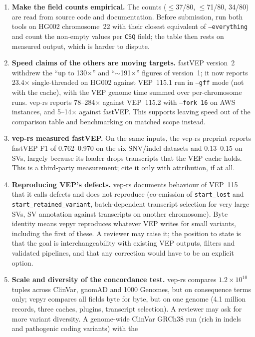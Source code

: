 \documentclass[11pt]{article}
\begin{document}
\begin{enumerate}
\item \textbf{Make the field counts empirical.} The counts ($\le$37/80,
  $\le$71/80, 34/80) are read from source code and documentation. Before
  submission, run both tools on HG002 chromosome~22 with their closest
  equivalent of \texttt{--everything} and count the non-empty values per
  \texttt{CSQ} field; the table then rests on measured output, which is
  harder to dispute.
\item \textbf{Speed claims of the others are moving targets.} fastVEP
  version~2 withdrew the ``up to 130$\times$'' and ``$\sim$191$\times$''
  figures of version~1; it now reports 23.4$\times$ single-threaded on HG002
  against VEP~115.1 run in \texttt{--gff} mode (not with the cache), with
  the VEP genome time summed over per-chromosome runs. vep-rs reports
  78--284$\times$ against VEP~115.2 with \texttt{--fork 16} on AWS
  instances, and 5--14$\times$ against fastVEP. This supports leaving speed
  out of the comparison table and benchmarking on matched scope instead.
\item \textbf{vep-rs measured fastVEP.} On the same inputs, the vep-rs
  preprint reports fastVEP F1 of 0.762--0.970 on the six SNV/indel datasets
  and 0.13--0.15 on SVs, largely because its loader drops transcripts that
  the VEP cache holds. This is a third-party measurement; cite it only with
  attribution, if at all.
\item \textbf{Reproducing VEP's defects.} vep-rs documents behaviour of
  VEP~115 that it calls defects and does not reproduce (co-emission of
  \texttt{start\_lost} and \texttt{start\_retained\_variant},
  batch-dependent transcript selection for very large SVs, SV annotation
  against transcripts on another chromosome). Byte identity means vepyr
  reproduces whatever VEP writes for small variants, including the first of
  these. A reviewer may raise it; the position to state is that the goal is
  interchangeability with existing VEP outputs, filters and validated
  pipelines, and that any correction would have to be an explicit option.
\item \textbf{Scale and diversity of the concordance test.} vep-rs compares
  $1.2\times10^{10}$ tuples across ClinVar, gnomAD and 1000 Genomes, but on
  consequence terms only; vepyr compares all fields byte for byte, but on
  one genome (4.1 million records, three caches, plugins, transcript
  selection). A reviewer may ask for more variant diversity. A genome-wide
  ClinVar GRCh38 run (rich in indels and pathogenic coding variants) with the

\end{enumerate}
\end{document}
